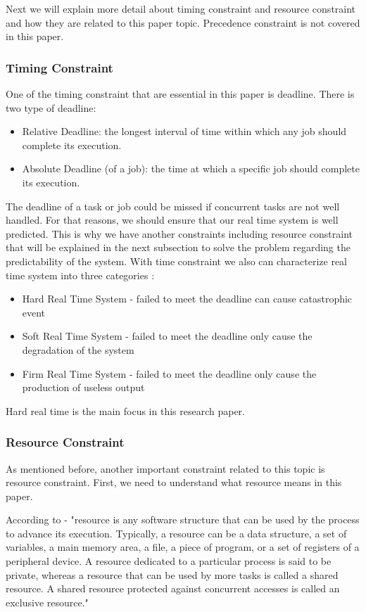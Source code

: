 Next we will explain more detail about timing constraint and resource constraint and how they are related to this paper topic. Precedence constraint is not covered in this paper. 

\subsubsection{Timing Constraint}

One of the timing constraint that are essential in this paper is deadline. There is two type of deadline:
\begin{itemize}
\item Relative Deadline: the longest interval of time within which any job should complete its execution\cite{b4}.
\item Absolute Deadline (of a job): the time at which a specific job should complete its execution\cite{b4}.
\end{itemize}

The deadline of a task or job could be missed if concurrent tasks are not well handled. For that reasons, we should ensure that our real time system is well predicted. This is why we have another constraints including resource constraint that will be explained in the next subsection to solve the problem regarding the predictability of the system. With time constraint we also can characterize real time system into three categories :
\begin{itemize}
\item Hard Real Time System - failed to meet the deadline can cause catastrophic event 
\item Soft Real Time System - failed to meet the deadline only cause the degradation of the system 
\item Firm Real Time System - failed to meet the deadline only cause the production of useless output 
\end{itemize}
Hard real time is the main focus in this research paper.

\subsubsection{Resource Constraint}

As mentioned before, another important constraint related to this topic is resource constraint. First, we need to understand what resource means in this paper.

According to \cite{b5} - "resource is any software structure that can be used by the process to advance its execution. Typically, a resource can be a data structure, a set of variables, a main memory area, a file, a piece of program, or a set of registers of a peripheral device. A resource dedicated to a particular process is said to be private, whereas a resource that can be used by more tasks is called a shared resource. A shared resource protected against concurrent accesses is called an exclusive resource."


